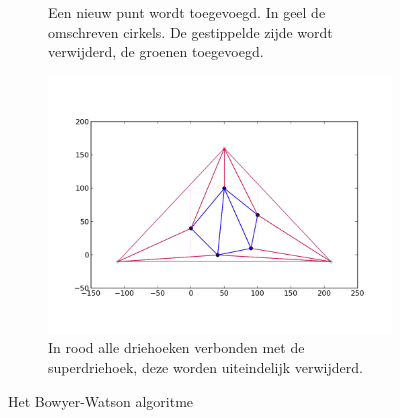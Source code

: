\begin{figure}
\begin{subfigure}{0.4\textwidth}
		\caption{Een nieuw punt wordt toegevoegd. In geel de omschreven cirkels. De gestippelde zijde wordt verwijderd, de groenen toegevoegd.}
		\label{bowyer-watson-b}
	\end{subfigure}
		\begin{subfigure}{0.4\textwidth}
		\includegraphics[width=\textwidth]{bowyer-watson_verwijderen}
		\caption{In rood alle driehoeken verbonden met de superdriehoek, deze worden uiteindelijk verwijderd.}
		\label{bowyer-watson-c}
	\end{subfigure}
	\caption{Het Bowyer-Watson algoritme \cite{Bowyer-WatsonWiki}}
	\label{bowyer-watson}
\end{figure}
